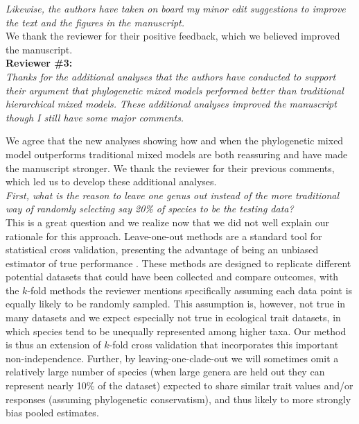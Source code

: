 \documentclass[11pt]{article}
\begin{document}
\emph{Likewise, the authors have taken on board my minor edit suggestions to improve the text and the figures in the manuscript.}\\

We thank the reviewer for their positive feedback, which we believed improved the manuscript.\\ %

{\bf Reviewer \#3:}\\ 


\emph{Thanks for the additional analyses that the authors have conducted to support their argument that phylogenetic mixed models performed better than traditional hierarchical mixed models. These additional analyses improved the manuscript though I still have some major comments.}

We agree that the new analyses showing how and when the phylogenetic mixed model outperforms traditional mixed models are both reassuring and have made the manuscript stronger. We thank the reviewer for their previous comments, which led us to develop these additional analyses. \\


\emph{First, what is the reason to leave one genus out instead of the more traditional way of randomly selecting say 20\% of species to be the testing data? }\\

This is a great question and we realize now that we did not well explain our rationale for this approach. Leave-one-out methods are a standard tool for statistical cross validation, presenting the advantage of being an unbiased estimator of true performance \citep{geroldinger2023leave}. These methods are designed to replicate different potential datasets that could have been collected and compare outcomes, with the $k$-fold methods the reviewer mentions specifically assuming each data point is equally likely to be randomly sampled. This assumption is, however, not true in many datasets and we expect especially not true in ecological trait datasets, in which species tend to be unequally represented among higher taxa. Our method is thus an extension of  $k$-fold cross validation that incorporates this important non-independence. Further, by leaving-one-clade-out we will sometimes omit a relatively large number of species (when large genera are held out they can represent nearly 10\% of the dataset) expected to share similar trait values and/or responses (assuming phylogenetic conservatism), and thus likely to more strongly bias pooled estimates.
\end{document}
